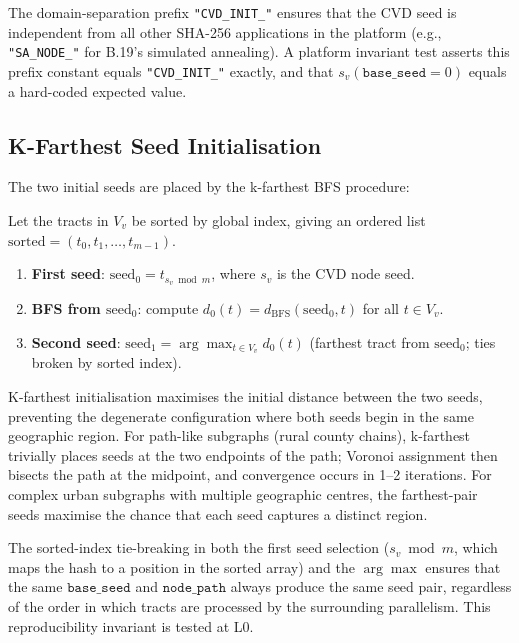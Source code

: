 The domain-separation prefix \texttt{"CVD\_INIT\_"} ensures that the CVD
seed is independent from all other SHA-256 applications in the platform
(e.g., \texttt{"SA\_NODE\_"} for B.19's simulated annealing).
A platform invariant test asserts this prefix constant equals
\texttt{"CVD\_INIT\_"} exactly, and that $s_v(\mathtt{base\_seed}=0)$
equals a hard-coded expected value.

\subsection{K-Farthest Seed Initialisation}

The two initial seeds are placed by the k-farthest BFS procedure:

\begin{definition}
\label{def:kfarthest}
Let the tracts in $V_v$ be sorted by global index, giving an ordered list
$\mathrm{sorted} = (t_0, t_1, \ldots, t_{m-1})$.
\begin{enumerate}
\item \textbf{First seed}: $\mathrm{seed}_0 = t_{s_v \bmod m}$, where $s_v$ is
  the CVD node seed.
\item \textbf{BFS from $\mathrm{seed}_0$}: compute $d_0(t) = d_{\mathrm{BFS}}(\mathrm{seed}_0, t)$
  for all $t \in V_v$.
\item \textbf{Second seed}: $\mathrm{seed}_1 = \arg\max_{t \in V_v} d_0(t)$
  (farthest tract from $\mathrm{seed}_0$; ties broken by sorted index).
\end{enumerate}
\end{definition}

K-farthest initialisation maximises the initial distance between the two seeds,
preventing the degenerate configuration where both seeds begin in the same
geographic region.
For path-like subgraphs (rural county chains), k-farthest trivially places
seeds at the two endpoints of the path; Voronoi assignment then bisects the
path at the midpoint, and convergence occurs in 1--2 iterations.
For complex urban subgraphs with multiple geographic centres, the farthest-pair
seeds maximise the chance that each seed captures a distinct region.

\begin{remark}
The sorted-index tie-breaking in both the first seed selection
($s_v \bmod m$, which maps the hash to a position in the sorted array) and
the $\arg\max$ ensures that the same $\mathtt{base\_seed}$ and
$\mathtt{node\_path}$ always produce the same seed pair, regardless of the
order in which tracts are processed by the surrounding parallelism.
This reproducibility invariant is tested at L0.
\end{remark}

